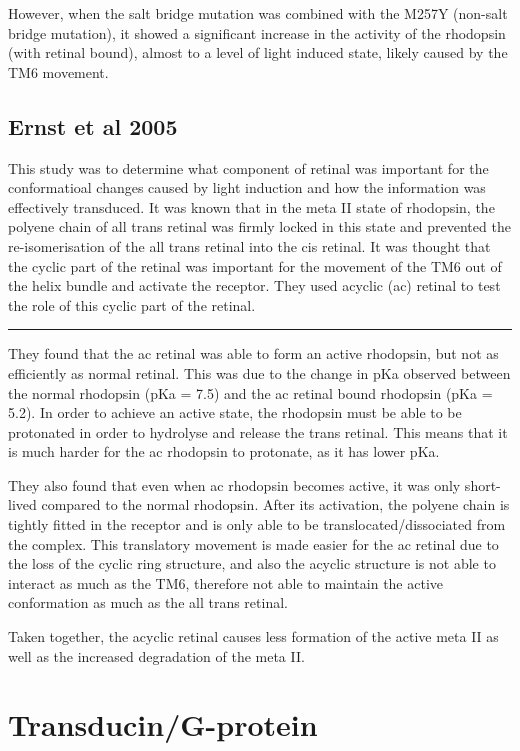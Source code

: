 \documentclass[a4paper,12pt]{article}
\begin{document}
However, when the salt bridge mutation was combined with the M257Y (non-salt bridge mutation), it showed a significant increase in the activity of the rhodopsin (with retinal bound), almost to a level of light induced state, likely caused by the TM6 movement.

\subsection*{\normalsize{Ernst et al 2005}}

This study was to determine what component of retinal was important for the conformatioal changes caused by light induction and how the information was effectively transduced.
It was known that in the meta II state of rhodopsin, the polyene chain of all trans retinal was firmly locked in this state and prevented the re-isomerisation of the all trans retinal into the cis retinal.
It was thought that the cyclic part of the retinal was important for the movement of the TM6 out of the helix bundle and activate the receptor.
They used acyclic (ac) retinal to test the role of this cyclic part of the retinal.

\noindent\rule{\textwidth}{0.4pt}

They found that the ac retinal was able to form an active rhodopsin, but not as efficiently as normal retinal.
This was due to the change in pKa observed between the normal rhodopsin (pKa = 7.5) and the ac retinal bound rhodopsin (pKa = 5.2).
In order to achieve an active state, the rhodopsin must be able to be protonated in order to hydrolyse and release the trans retinal.
This means that it is much harder for the ac rhodopsin to protonate, as it has lower pKa.

They also found that even when ac rhodopsin becomes active, it was only short-lived compared to the normal rhodopsin.
After its activation, the polyene chain is tightly fitted in the receptor and is only able to be translocated/dissociated from the complex.
This translatory movement is made easier for the ac retinal due to the loss of the cyclic ring structure, and also the acyclic structure is not able to interact as much as the TM6, therefore not able to maintain the active conformation as much as the all trans retinal.

Taken together, the acyclic retinal causes less formation of the active meta II as well as the increased degradation of the meta II.

\section*{Transducin/G-protein}
\end{document}
